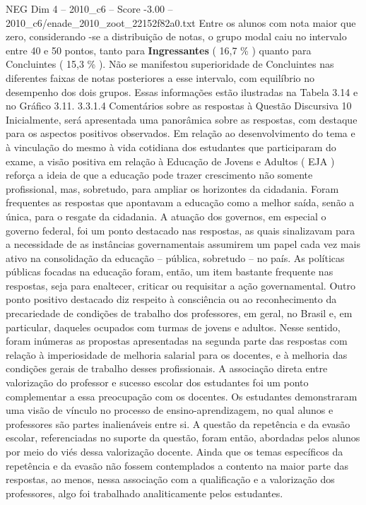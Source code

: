 \begin{textsample}{NEG Dim 4 – 2010\_c6 – Score -3.00 – 2010\_c6/enade\_2010\_zoot\_22152f82a0.txt}
Entre os alunos com nota maior que zero, considerando -se a distribuição de notas, o grupo modal caiu no intervalo entre 40 e 50 pontos, tanto para \textbf{Ingressantes} ( 16,7 \% ) quanto para Concluintes ( 15,3 \% ).
Não se manifestou superioridade de Concluintes nas diferentes faixas de notas posteriores a esse intervalo, com equilíbrio no desempenho dos dois grupos.
Essas informações estão ilustradas na Tabela 3.14 e no Gráfico 3.11. 3.3.1.4 Comentários sobre as respostas à Questão Discursiva 10 Inicialmente, será apresentada uma panorâmica sobre as respostas, com destaque para os aspectos positivos observados.
Em relação ao desenvolvimento do tema e à vinculação do mesmo à vida cotidiana dos estudantes que participaram do exame, a visão positiva em relação à Educação de Jovens e Adultos ( EJA ) reforça a ideia de que a educação pode trazer crescimento não somente profissional, mas, sobretudo, para ampliar os horizontes da cidadania.
Foram frequentes as respostas que apontavam a educação como a melhor saída, senão a única, para o resgate da cidadania.
A atuação dos governos, em especial o governo federal, foi um ponto destacado nas respostas, as quais sinalizavam para a necessidade de as instâncias governamentais assumirem um papel cada vez mais ativo na consolidação da educação – pública, sobretudo – no país.
As políticas públicas focadas na educação foram, então, um item bastante frequente nas respostas, seja para enaltecer, criticar ou requisitar a ação governamental.
Outro ponto positivo destacado diz respeito à consciência ou ao reconhecimento da precariedade de condições de trabalho dos professores, em geral, no Brasil e, em particular, daqueles ocupados com turmas de jovens e adultos.
Nesse sentido, foram inúmeras as propostas apresentadas na segunda parte das respostas com relação à imperiosidade de melhoria salarial para os docentes, e à melhoria das condições gerais de trabalho desses profissionais.
A associação direta entre valorização do professor e sucesso escolar dos estudantes foi um ponto complementar a essa preocupação com os docentes.
Os estudantes demonstraram uma visão de vínculo no processo de ensino-aprendizagem, no qual alunos e professores são partes inalienáveis entre si.
A questão da repetência e da evasão escolar, referenciadas no suporte da questão, foram então, abordadas pelos alunos por meio do viés dessa valorização docente.
Ainda que os temas específicos da repetência e da evasão não fossem contemplados a contento na maior parte das respostas, ao menos, nessa associação com a qualificação e a valorização dos professores, algo foi trabalhado analiticamente pelos estudantes.

\end{textsample}
